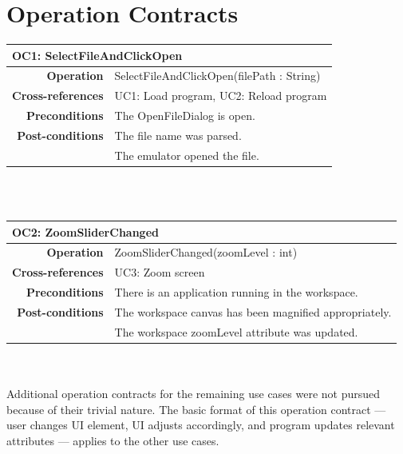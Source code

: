\documentclass[12pt]{article}
\begin{document}
\section{Operation Contracts}
\begin{tabular*}{\textwidth}{r | l}
  \multicolumn{2}{l}{\textbf{OC1: SelectFileAndClickOpen}} \\ \hline
  \textbf{Operation} & SelectFileAndClickOpen(filePath : String) \\
  \textbf{Cross-references} & UC1: Load  program, UC2: Reload program \\
  \textbf{Preconditions} & The OpenFileDialog is open. \\
  \textbf{Post-conditions} & The file name was parsed. \\
                            & The emulator opened the file. \\ \hline
\end{tabular*} \\\\

\begin{tabular*}{\textwidth}{r | l}
  \multicolumn{2}{l}{\textbf{OC2: ZoomSliderChanged}} \\ \hline
  \textbf{Operation} & ZoomSliderChanged(zoomLevel : int) \\
  \textbf{Cross-references} & UC3: Zoom screen \\
  \textbf{Preconditions} & There is an application running in the workspace. \\
  \textbf{Post-conditions} & The workspace canvas has been magnified appropriately. \\
                           & The workspace zoomLevel attribute was updated. \\ \hline
\end{tabular*} \\\\

Additional operation contracts for the remaining use cases were not pursued because of their trivial nature. The basic format of this operation contract --- user changes UI element, UI adjusts accordingly, and program updates relevant attributes --- applies to the other use cases.
\end{document}
